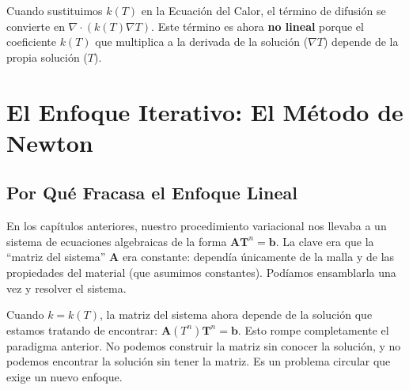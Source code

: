 Cuando sustituimos \(k(T)\) en la Ecuación del Calor, el término de difusión se convierte en \(\nabla \cdot (k(T) \nabla T)\). Este término es ahora \textbf{no lineal} porque el coeficiente \(k(T)\) que multiplica a la derivada de la solución (\(\nabla T\)) depende de la propia solución (\(T\)).

\section{El Enfoque Iterativo: El Método de Newton}
\label{sec:newton-method}

\subsection{Por Qué Fracasa el Enfoque Lineal}
En los capítulos anteriores, nuestro procedimiento variacional nos llevaba a un sistema de ecuaciones algebraicas de la forma \(\mathbf{A}\mathbf{T}^n = \mathbf{b}\). La clave era que la ``matriz del sistema'' \(\mathbf{A}\) era constante: dependía únicamente de la malla y de las propiedades del material (que asumimos constantes). Podíamos ensamblarla una vez y resolver el sistema.

Cuando \(k=k(T)\), la matriz del sistema ahora depende de la solución que estamos tratando de encontrar: \(\mathbf{A}(T^n)\mathbf{T}^n = \mathbf{b}\). Esto rompe completamente el paradigma anterior. No podemos construir la matriz sin conocer la solución, y no podemos encontrar la solución sin tener la matriz. Es un problema circular que exige un nuevo enfoque.

